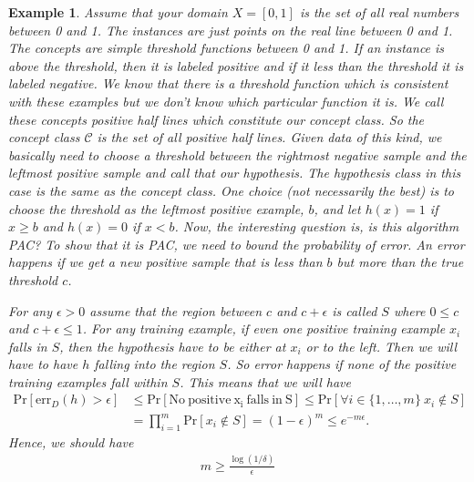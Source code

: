 \documentclass[10pt ]{article}
\newtheorem{example}{Example}
\begin{document}
\begin{example}{\em
\label{example_positive_half_lines}
Assume that your domain $X = [0,1]$ is the set of all real numbers between 0 and 1. The instances are just points on the real line between 0 and 1. The concepts are simple threshold functions between 0 and 1. If an instance is above the threshold, then it is labeled positive and if it less than the threshold it is labeled negative. We know that there is a threshold function which is consistent with these examples but we don't know which particular function it is. We call these concepts {\em positive half lines} which constitute our concept class. So the concept class $\mathcal{C}$ is the set of all positive half lines. Given data of this kind, we basically need to choose a threshold between the rightmost negative sample and the leftmost positive sample and call that our hypothesis. The hypothesis class in this case is the same as the concept class. One choice (not necessarily the best) is to choose the threshold as the leftmost positive example, $b$, and let $h(x) = 1$ if $x \ge b$ and  $h(x) = 0$ if $x < b$. Now, the interesting question is, is this algorithm PAC? To show that it is PAC, we need to bound the probability of error. An error happens if we get a new positive sample that is less than $b$ but more than the true threshold $c$. 

For any $\epsilon >0$ assume that the region between $c$ and $c+\epsilon$ is called $S$ where $0 \le c$ and $c + \epsilon \le 1$. For any training example, if even one positive training example $x_i$ falls in $S$, then the hypothesis have to be either at $x_i$ or to the left. Then we will have to have $h$ falling into the region $S$. So error happens if none of the positive training examples fall within $S$. This means that we will have  
\begin{align}
\mathrm{Pr} \left[ \mathrm{err}_D(h) > \epsilon \right] &\le  \mathrm{Pr} \left[ \mathrm{No ~positive~ x_i ~ falls ~in ~S} \right] \le  \mathrm{Pr} \left[ \forall i \in \{1,\dots,m\}~ x_i \notin S \right] \nonumber \\
&=\prod_{i=1}^m \mathrm{Pr} \left[ x_i \notin S \right] = (1-\epsilon)^m \le  e^{-m\epsilon}.
\end{align}
Hence, we should have 
\begin{align}
m \ge \frac{\log(1/\delta)}{\epsilon}
\end{align}
}
\end{example}
\end{document}
